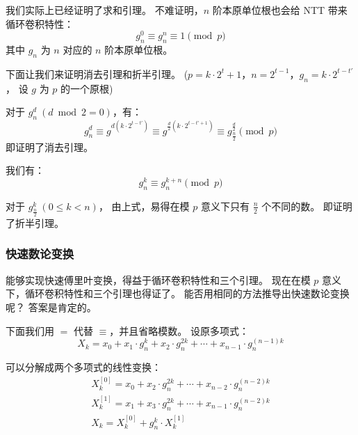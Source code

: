 \documentclass[12pt, UTF8]{article}
\begin{document}

    \bigskip
    我们实际上已经证明了求和引理。
    不难证明，$n$ 阶本原单位根也会给 NTT 带来循环卷积特性：
    \begin{equation*}
        g_n^0 \equiv g_n^n \equiv 1 \pmod {p}
    \end{equation*}
    其中 $g_n$ 为 $n$ 对应的 $n$ 阶本原单位根。

    \bigskip
    下面让我们来证明消去引理和折半引理。
    ($p = k · 2^t + 1$，$n = 2^{t - 1}$，$g_n = k · 2^{t - t'}$，
    设 $g$ 为 $p$ 的一个原根)

    对于 $g_n^d ~ (d \bmod 2 = 0)$，有：
    \begin{equation*}
        g_n^d \equiv g^{d (k · 2^{t - t'})}
        \equiv g^{\frac {d} {2} (k · 2^{t - t' + 1})}
        \equiv g_{\frac {n} {2}}^{\frac {d} {2}}
        \pmod {p}
    \end{equation*}
    即证明了消去引理。

    \bigskip
    我们有：
    \begin{equation*}
        g_n^k \equiv g_n^{k + n} \pmod {p}
    \end{equation*}

    对于 $g_{\frac {n} {2}}^{k} ~ (0 \le k < n)$，
    由上式，易得在模 $p$ 意义下只有 $\frac {n} {2}$ 个不同的数。
    即证明了折半引理。

    \subsubsection{快速数论变换}
    能够实现快速傅里叶变换，得益于循环卷积特性和三个引理。
    现在在模 $p$ 意义下，循环卷积特性和三个引理也得证了。
    能否用相同的方法推导出快速数论变换呢？
    答案是肯定的。

    \bigskip
    下面我们用 $=$ 代替 $\equiv$，并且省略模数。
    设原多项式：
    \begin{equation*}
        X_k = x_0 + x_1 · g_n^{k} + x_2 · g_n^{2k} +
        \cdots + x_{n - 1} · g_n^{(n - 1)k}
    \end{equation*}

    可以分解成两个多项式的线性变换：
    \begin{gather*}
        X_k^{[0]} = x_0 + x_2 · g_n^{2k} + \cdots
        + x_{n - 2} · g_n^{(n - 2)k}
        \\
        X_k^{[1]} = x_1 + x_3 · g_n^{2k} + \cdots
        + x_{n - 1} · g_n^{(n - 2)k}
        \\
        X_k = X_k^{[0]} + g_n^k · X_k^{[1]}
    \end{gather*}
\end{document}
